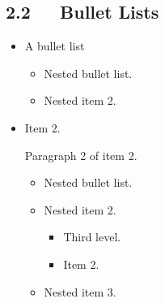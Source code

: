 \documentclass[10pt,a4paper,english]{article}
\begin{document}
\subsection*{2.2~~~Bullet Lists}
\begin{itemize}
\item {} 
A bullet list
\begin{itemize}
\item {} 
Nested bullet list.

\item {} 
Nested item 2.

\end{itemize}

\item {} 
Item 2.

Paragraph 2 of item 2.
\begin{itemize}
\item {} 
Nested bullet list.

\item {} 
Nested item 2.
\begin{itemize}
\item {} 
Third level.

\item {} 
Item 2.

\end{itemize}

\item {} 
Nested item 3.

\end{itemize}

\end{itemize}



\hypertarget{enumerated-lists}{}
\end{document}
